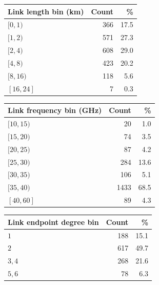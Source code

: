 \documentclass[a4paper,fleqn]{cas-sc}
\begin{document}
\begin{table}[!htbp]
  \centering
  \begin{minipage}[t]{0.31\textwidth}
    \centering
    \scriptsize
    \begin{tabular}{lrr}
      \toprule
      Link length bin (km) & Count & \%   \\
      \midrule
      $[0,1)$         & 366   & 17.5 \\
      $[1,2)$         & 571   & 27.3 \\
      $[2,4)$         & 608   & 29.0 \\
      $[4,8)$         & 423   & 20.2 \\
      $[8,16)$        & 118   & 5.6  \\
      $[16,24]$       & 7     & 0.3  \\
      \bottomrule
    \end{tabular}
  \end{minipage}
  \hfill
  \begin{minipage}[t]{0.31\textwidth}
    \centering
    \scriptsize
    \begin{tabular}{lrr}
      \toprule
      Link frequency bin (GHz) & Count & \%   \\
      \midrule
      $[10,15)$           & 20    & 1.0  \\
      $[15,20)$           & 74    & 3.5  \\
      $[20,25)$           & 87    & 4.2  \\
      $[25,30)$           & 284   & 13.6 \\
      $[30,35)$           & 106   & 5.1  \\
      $[35,40)$           & 1433  & 68.5 \\
      $[40,60]$           & 89    & 4.3  \\
      \bottomrule
    \end{tabular}
  \end{minipage}
  \hfill
  \begin{minipage}[t]{0.31\textwidth}
    \centering
    \scriptsize
    \begin{tabular}{lrr}
      \toprule
      Link endpoint degree bin & Count & \%   \\
      \midrule
      $1$                 & 188   & 15.1 \\
      $2$                 & 617   & 49.7 \\
      $3,4$               & 268   & 21.6 \\
      $5,6$               & 78    & 6.3  \\

\end{tabular}
\end{minipage}
\end{table}
\end{document}
